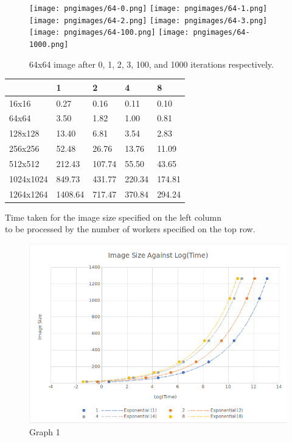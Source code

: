 \documentclass{article}
\begin{document}
\begin{figure}[H]
\centering
\texttt{[image: pngimages/64-0.png]}
\texttt{[image: pngimages/64-1.png]}
\texttt{[image: pngimages/64-2.png]}
\texttt{[image: pngimages/64-3.png]}
\texttt{[image: pngimages/64-100.png]}
\texttt{[image: pngimages/64-1000.png]}
\caption{64x64 image after 0, 1, 2, 3, 100, and 1000 iterations respectively.}
\end{figure}

\begin{center}
\begin{tabular}{ | l | l | l | l | l |}
\hline
   & 1 & 2 & 4 & 8 \\ \hline
16x16 & 0.27 & 0.16 & 0.11 & 0.10 \\ \hline
64x64 & 3.50 & 1.82 & 1.00 & 0.81 \\ \hline
128x128 & 13.40 & 6.81 & 3.54 & 2.83 \\ \hline
256x256 & 52.48 & 26.76 & 13.76 & 11.09 \\ \hline
512x512 & 212.43 & 107.74 & 55.50 & 43.65 \\ \hline
1024x1024 & 849.73 & 431.77 & 220.34 & 174.81 \\ \hline
1264x1264 & 1408.64 & 717.47 & 370.84 & 294.24 \\ \hline
\end{tabular}

\vspace{5mm}

Time taken for the image size specified on the left column \\
to be processed by the number of workers specified on the top row.

\end{center}

\newpage

\begin{figure}[H]
\centering
\includegraphics[width=15cm]{ImvsLog(Time)(BeforePow).png}
\caption{Graph 1}
\end{figure}
\end{document}
